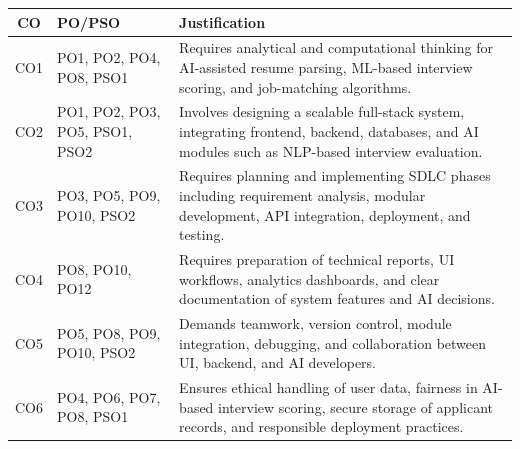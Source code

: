 \documentclass[a4paper, 12pt]{report}
\begin{document}
\renewcommand{\arraystretch}{1.4}
\begin{center}
\begin{tabular}{|c|p{3.5cm}|p{9cm}|}
\hline
\textbf{CO} & \textbf{PO/PSO} & \textbf{Justification} \\ \hline

CO1 & PO1, PO2, PO4, PO8, PSO1 &  
Requires analytical and computational thinking for AI-assisted resume parsing, ML-based interview scoring, and job-matching algorithms. \\ \hline

CO2 & PO1, PO2, PO3, PO5, PSO1, PSO2 &  
Involves designing a scalable full-stack system, integrating frontend, backend, databases, and AI modules such as NLP-based interview evaluation. \\ \hline

CO3 & PO3, PO5, PO9, PO10, PSO2 &
Requires planning and implementing SDLC phases including requirement analysis, modular development, API integration, deployment, and testing. \\ \hline

CO4 & PO8, PO10, PO12 &
Requires preparation of technical reports, UI workflows, analytics dashboards, and clear documentation of system features and AI decisions. \\ \hline

CO5 & PO5, PO8, PO9, PO10, PSO2 &
Demands teamwork, version control, module integration, debugging, and collaboration between UI, backend, and AI developers. \\ \hline

CO6 & PO4, PO6, PO7, PO8, PSO1 &
Ensures ethical handling of user data, fairness in AI-based interview scoring, secure storage of applicant records, and responsible deployment practices. \\ \hline

\end{tabular}
\end{center}
\end{document}
